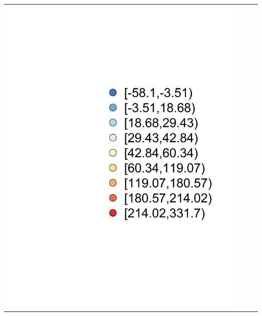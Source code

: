 \begin{landscape}
\begin{tabular}{c c c l}
					\includegraphics[trim= 5cm 2cm 0cm 3cm, clip, scale = 0.3]{./img/pbias_legend} \\

\end{tabular}
\end{landscape}
